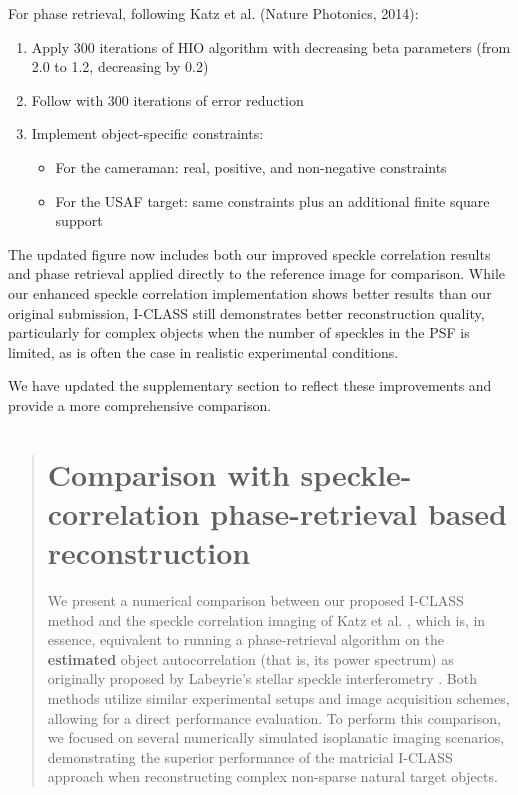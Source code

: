 \documentclass[12pt]{article}
\newenvironment{ourresponse}
    {\begin{tcolorbox}[width=\linewidth,breakable,enhanced,colback=gray!5,colframe=responsecolor!50,title=Response,left=5pt,right=5pt]}
    {\end{tcolorbox}}
\begin{document}
\begin{ourresponse}
    For phase retrieval, following Katz et al. (Nature Photonics, 2014):
    \begin{enumerate}
        \item Apply 300 iterations of HIO algorithm with decreasing beta parameters (from 2.0 to 1.2, decreasing by 0.2)
        \item Follow with 300 iterations of error reduction
        \item Implement object-specific constraints:
        \begin{itemize}
            \item  For the cameraman: real, positive, and non-negative constraints
            \item  For the USAF target: same constraints plus an additional finite square support
        \end{itemize}
    \end{enumerate}
    
    
    The updated figure now includes both our improved speckle correlation results and phase retrieval applied directly to the reference image for comparison. While our enhanced speckle correlation implementation shows better results than our original submission, I-CLASS still demonstrates better reconstruction quality, particularly for complex objects when the number of speckles in the PSF is limited, as is often the case in realistic experimental conditions.
    
    We have updated the supplementary section to reflect these improvements and provide a more comprehensive comparison.

                \begin{quote}
        \section*{Comparison with speckle-correlation phase-retrieval based reconstruction}

        We present a numerical comparison between our proposed I-CLASS method and the speckle correlation imaging of Katz et al. \cite{katz14}, which is, in essence, equivalent to running a phase-retrieval algorithm on the \textbf{estimated} object autocorrelation (that is, its power spectrum) as originally proposed by Labeyrie's stellar speckle interferometry \cite{labeyrie1970attainment}. 
        Both methods utilize similar experimental setups and image acquisition schemes, allowing for a direct performance evaluation. To perform this comparison, we focused on several numerically simulated isoplanatic imaging scenarios, demonstrating the superior performance of the matricial I-CLASS approach when reconstructing complex non-sparse natural target objects.
        

\end{quote}
\end{ourresponse}
\end{document}
